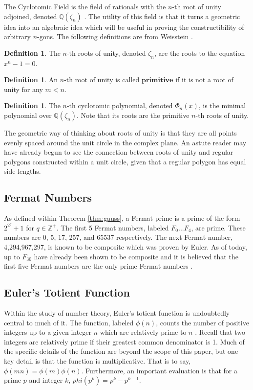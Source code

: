 \documentclass[reqno]{amsart}
\theoremstyle{definition}
\newtheorem{definition}[theorem]{Definition}
\numberwithin{equation}{section}
\newcommand{\bQ}{\mathbb{Q}}
\newcommand{\bZ}{\mathbb{Z}}
\begin{document}
The Cyclotomic Field is the field of rationals with the $n$-th root of unity adjoined, denoted $\bQ(\zeta_n)$ \cite{kuh}. The utility of this field is that it turns a geometric idea into an algebraic idea which will be useful in proving the constructibility of arbitrary $n$-gons. The following definitions are from Weisstein \cite{Weisstein}.
\begin{definition}
The $n$-th roots of unity, denoted $\zeta_n$, are the roots to the equation $x^n - 1 = 0$.
\end{definition}
\begin{definition}
An $n$-th root of unity is called $\mathbf{primitive}$ if it is not a root of unity for any $m < n$.
\end{definition}
\begin{definition}
The $n$-th cyclotomic polynomial, denoted $\Phi_n(x)$, is the minimal polynomial over $\bQ(\zeta_n)$. Note that its roots are the primitive $n$-th roots of unity.
\end{definition}

The geometric way of thinking about roots of unity is that they are all points evenly spaced around the unit circle in the complex plane. An astute reader may have already begun to see the connection between roots of unity and regular polygons constructed within a unit circle, given that a regular polygon has equal side lengths.

\subsection{Fermat Numbers}\label{subsec:fn}

As defined within Theorem \ref{thm:gauss}, a Fermat prime is a prime of the form $2^{2^q} + 1$ for $q \in \bZ^+$. The first 5 Fermat numbers, labeled $F_0...F_4$, are prime. These numbers are 0, 5, 17, 257, and 65537 respectively. The next Fermat number, 4,294,967,297, is known to be composite which was proven by Euler. As of today, up to $F_30$ have already been shown to be composite and it is believed that the first five Fermat numbers are the only prime Fermat numbers \cite{hardy}.

\subsection{Euler's Totient Function}\label{subsec:etf}

Within the study of number theory, Euler's totient function is undoubtedly central to much of it. The function, labeled $\phi(n)$, counts the number of positive integers up to a given integer $n$ which are relatively prime to $n$ \cite{vinogradov}. Recall that two integers are relatively prime if their greatest common denominator is 1. Much of the specific details of the function are beyond the scope of this paper, but one key detail is that the function is multiplicative. That is to say, $\phi(mn) = \phi(m)\phi(n)$. Furthermore, an important evaluation is that for a prime $p$ and integer $k$, $phi(p^k) = p^k - p^{k-1}$.
\end{document}
